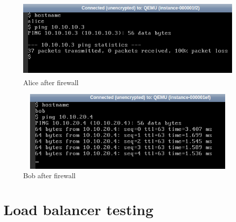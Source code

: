     \begin{figure}[h]
            \centering
            \includegraphics[width=14cm,height=4cm]{images/alice_after.png}
            \caption{Alice after firewall}
    \end{figure}
    \begin{figure}[h]
            \centering
            \includegraphics[width=14cm,height=4cm]{images/bob_after.png}
            \caption{Bob after firewall}
    \end{figure}    
    
    \clearpage
    \section{Load balancer testing}